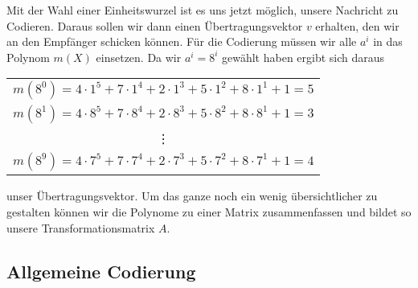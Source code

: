 Mit der Wahl einer Einheitswurzel ist es uns jetzt möglich, unsere Nachricht zu Codieren. Daraus sollen wir dann einen Übertragungsvektor $v$ erhalten, den wir an den Empfänger schicken können. Für die Codierung müssen wir alle $a^i$ in das Polynom $m(X)$ einsetzen. Da wir $a^i = 8^i$ gewählt haben  ergibt sich daraus 
%
%
\begin{center}
	\begin{tabular}{c}
		$m(8^0) = 4 \cdot 1^5 + 7 \cdot 1^4 + 2 \cdot 1^3 + 5 \cdot 1^2 + 8 \cdot 1^1 + 1 = 5$ \\
		$m(8^1) = 4 \cdot 8^5 + 7 \cdot 8^4 + 2 \cdot 8^3 + 5 \cdot 8^2 + 8 \cdot 8^1 + 1 = 3$ \\
		\vdots \\
		$m(8^9) = 4 \cdot 7^5 + 7 \cdot 7^4 + 2 \cdot 7^3 + 5 \cdot 7^2 + 8 \cdot 7^1 + 1 = 4$
	\end{tabular}
\end{center}
unser Übertragungsvektor. Um das ganze noch ein wenig übersichtlicher zu gestalten können wir die Polynome zu einer Matrix zusammenfassen und bildet so unsere Transformationsmatrix $A$.

\subsection{Allgemeine Codierung
	\label{reedsolomon:subsection:algCod}}

